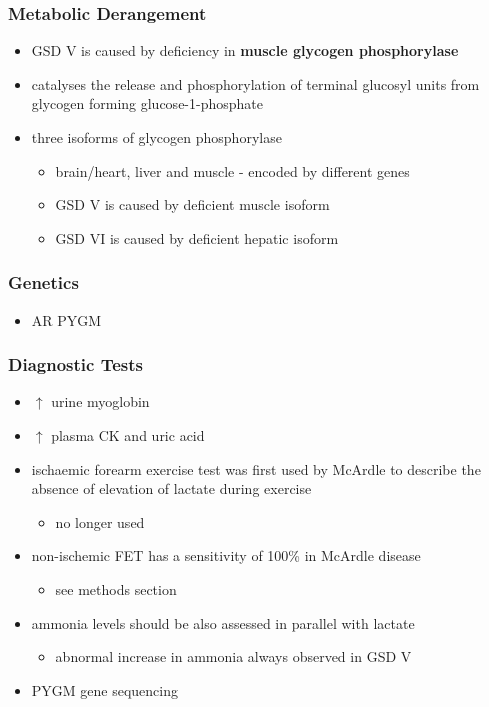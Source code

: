 \documentclass[12pt]{scrartcl}
\begin{document}
\subsubsection{Metabolic Derangement}
\label{sec:org0a8bebc}
\begin{itemize}
\item GSD V is caused by deficiency in \textbf{muscle glycogen phosphorylase}
\item catalyses the release and phosphorylation of terminal glucosyl units
from glycogen forming glucose-1-phosphate
\item three isoforms of glycogen phosphorylase
\begin{itemize}
\item brain/heart, liver and muscle - encoded by different genes
\item GSD V is caused by deficient muscle isoform
\item GSD VI is caused by deficient hepatic isoform
\end{itemize}
\end{itemize}

\subsubsection{Genetics}
\label{sec:org5d0f30c}
\begin{itemize}
\item AR PYGM
\end{itemize}

\subsubsection{Diagnostic Tests}
\label{sec:org1229066}
\begin{itemize}
\item \(\uparrow\) urine myoglobin
\item \(\uparrow\) plasma CK and uric acid
\item ischaemic forearm exercise test was first used by McArdle to
describe the absence of elevation of lactate during exercise
\begin{itemize}
\item no longer used
\end{itemize}
\item non-ischemic FET has a sensitivity of 100\% in McArdle disease
\begin{itemize}
\item see methods section
\end{itemize}
\item ammonia levels should be also assessed in parallel with lactate
\begin{itemize}
\item abnormal increase in ammonia always observed in GSD V
\end{itemize}
\item PYGM gene sequencing
\end{itemize}
\end{document}
